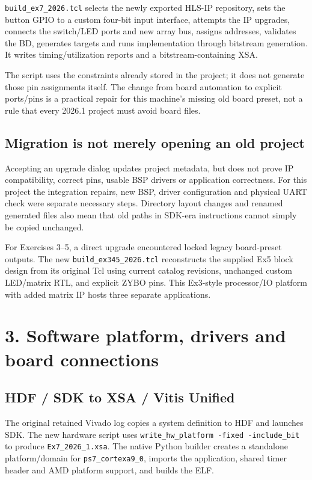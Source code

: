 \documentclass[11pt,a4paper]{article}
\begin{document}
\texttt{build\_ex7\_2026.tcl} selects the newly exported HLS-IP repository,
sets the button GPIO to a custom four-bit input interface, attempts the IP
upgrades, connects the switch/LED ports and new array bus, assigns addresses,
validates the BD, generates targets and runs implementation through bitstream
generation. It writes timing/utilization reports and a bitstream-containing XSA.

The script uses the constraints already stored in the project; it does not
generate those pin assignments itself. The change from board automation to
explicit ports/pins is a practical repair for this machine's missing old board
preset, not a rule that every 2026.1 project must avoid board files.

\subsection*{Migration is not merely opening an old project}
Accepting an upgrade dialog updates project metadata, but does not prove IP
compatibility, correct pins, usable BSP drivers or application correctness.
For this project the integration repairs, new BSP, driver configuration and
physical UART check were separate necessary steps. Directory layout changes
and renamed generated files also mean that old paths in SDK-era instructions
cannot simply be copied unchanged.

For Exercises 3--5, a direct upgrade encountered locked legacy board-preset
outputs. The new \texttt{build\_ex345\_2026.tcl} reconstructs the supplied Ex5
block design from its original Tcl using current catalog revisions, unchanged
custom LED/matrix RTL, and explicit ZYBO pins. This Ex3-style processor/IO
platform with added matrix IP hosts three separate applications.

\newpage
\section*{3. Software platform, drivers and board connections}
\subsection*{HDF / SDK to XSA / Vitis Unified}
The original retained Vivado log copies a system definition to HDF and launches
SDK. The new hardware script uses \texttt{write\_hw\_platform -fixed -include\_bit}
to produce \texttt{Ex7\_2026\_1.xsa}. The native Python builder creates a
standalone platform/domain for \texttt{ps7\_cortexa9\_0}, imports the application,
shared timer header and AMD platform support, and builds the ELF.
\end{document}
